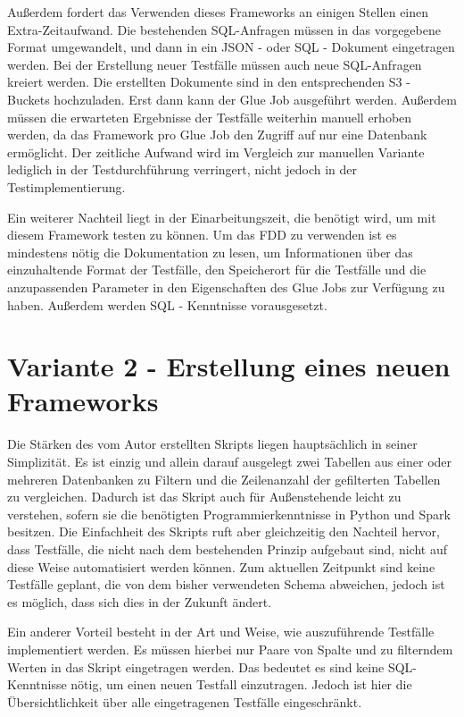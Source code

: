 Außerdem fordert das Verwenden dieses Frameworks an einigen Stellen einen Extra-Zeitaufwand. Die bestehenden SQL-Anfragen müssen in das vorgegebene Format umgewandelt, und dann in ein \ac{JSON} - oder \ac{SQL} - Dokument eingetragen werden. Bei der Erstellung neuer Testfälle müssen auch neue SQL-Anfragen kreiert werden. Die erstellten Dokumente sind in den entsprechenden \ac{S3} - Buckets hochzuladen. Erst dann kann der Glue Job ausgeführt werden. 
Außerdem müssen die erwarteten Ergebnisse der Testfälle weiterhin manuell erhoben werden, da das Framework pro Glue Job den Zugriff auf nur eine Datenbank ermöglicht. Der zeitliche Aufwand wird im Vergleich zur manuellen Variante lediglich in der Testdurchführung verringert, nicht jedoch in der Testimplementierung.
\newline


Ein weiterer Nachteil liegt in der Einarbeitungszeit, die benötigt wird, um mit diesem Framework testen zu können. Um das \ac{FDD} zu verwenden ist es mindestens nötig die Dokumentation zu lesen, um Informationen über das einzuhaltende Format der Testfälle, den Speicherort für die Testfälle und die anzupassenden Parameter in den Eigenschaften des Glue Jobs zur Verfügung zu haben. Außerdem werden \ac{SQL} - Kenntnisse vorausgesetzt.




\section{Variante 2 - Erstellung eines neuen Frameworks}
Die Stärken des vom Autor erstellten Skripts liegen hauptsächlich in seiner Simplizität. Es ist einzig und allein darauf ausgelegt zwei Tabellen aus einer oder mehreren Datenbanken zu Filtern und die Zeilenanzahl der gefilterten Tabellen zu vergleichen. Dadurch ist das Skript auch für Außenstehende leicht zu verstehen, sofern sie die benötigten Programmierkenntnisse in Python und Spark besitzen. 
Die Einfachheit des Skripts ruft aber gleichzeitig den Nachteil hervor, dass Testfälle, die nicht nach dem bestehenden Prinzip aufgebaut sind, nicht auf diese Weise automatisiert werden können. 
Zum aktuellen Zeitpunkt sind keine Testfälle geplant, die von dem bisher verwendeten Schema abweichen, jedoch ist es möglich, dass sich dies in der Zukunft ändert.
\newline


Ein anderer Vorteil besteht in der Art und Weise, wie auszuführende Testfälle implementiert werden. Es  müssen hierbei nur Paare von Spalte und zu filterndem Werten in das Skript eingetragen werden. Das bedeutet es sind keine \ac{SQL}-Kenntnisse nötig, um einen neuen Testfall einzutragen. Jedoch ist hier  die Übersichtlichkeit über alle eingetragenen Testfälle eingeschränkt.
\newline


